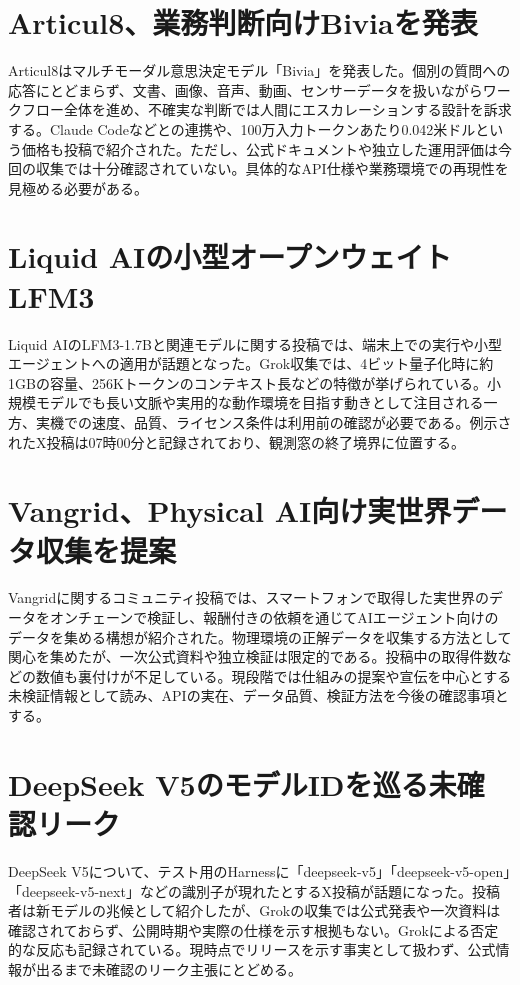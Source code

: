 \section{Articul8、業務判断向けBiviaを発表}
Articul8はマルチモーダル意思決定モデル「Bivia」を発表した。個別の質問への応答にとどまらず、文書、画像、音声、動画、センサーデータを扱いながらワークフロー全体を進め、不確実な判断では人間にエスカレーションする設計を訴求する。Claude Codeなどとの連携や、100万入力トークンあたり0.042米ドルという価格も投稿で紹介された。ただし、公式ドキュメントや独立した運用評価は今回の収集では十分確認されていない。具体的なAPI仕様や業務環境での再現性を見極める必要がある。

\section{Liquid AIの小型オープンウェイトLFM3}
Liquid AIのLFM3-1.7Bと関連モデルに関する投稿では、端末上での実行や小型エージェントへの適用が話題となった。Grok収集では、4ビット量子化時に約1GBの容量、256Kトークンのコンテキスト長などの特徴が挙げられている。小規模モデルでも長い文脈や実用的な動作環境を目指す動きとして注目される一方、実機での速度、品質、ライセンス条件は利用前の確認が必要である。例示されたX投稿は07時00分と記録されており、観測窓の終了境界に位置する。

\section{Vangrid、Physical AI向け実世界データ収集を提案}
Vangridに関するコミュニティ投稿では、スマートフォンで取得した実世界のデータをオンチェーンで検証し、報酬付きの依頼を通じてAIエージェント向けのデータを集める構想が紹介された。物理環境の正解データを収集する方法として関心を集めたが、一次公式資料や独立検証は限定的である。投稿中の取得件数などの数値も裏付けが不足している。現段階では仕組みの提案や宣伝を中心とする未検証情報として読み、APIの実在、データ品質、検証方法を今後の確認事項とする。

\section{DeepSeek V5のモデルIDを巡る未確認リーク}
DeepSeek V5について、テスト用のHarnessに「deepseek-v5」「deepseek-v5-open」「deepseek-v5-next」などの識別子が現れたとするX投稿が話題になった。投稿者は新モデルの兆候として紹介したが、Grokの収集では公式発表や一次資料は確認されておらず、公開時期や実際の仕様を示す根拠もない。Grokによる否定的な反応も記録されている。現時点でリリースを示す事実として扱わず、公式情報が出るまで未確認のリーク主張にとどめる。
